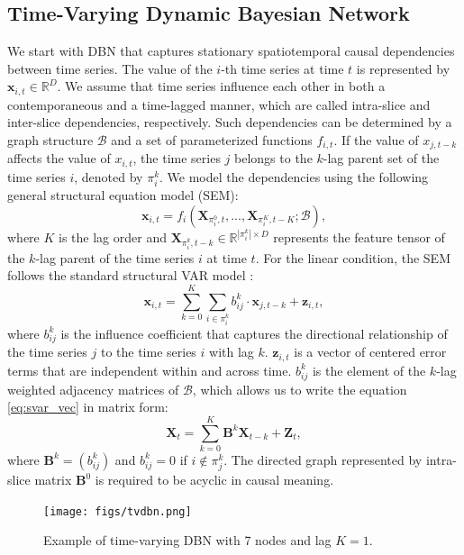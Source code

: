\documentclass[letterpaper, 10 pt, conference]{ieeeconf}
\begin{document}
\subsection{Time-Varying Dynamic Bayesian Network}
We start with DBN that captures stationary spatiotemporal causal dependencies between time series. The value of the $i$-th time series at time $t$ is represented by $\mathbf{x}_{i,t}\in \mathbb{R}^D$. We assume that time series influence each other in both a contemporaneous and a time-lagged manner, which are called intra-slice and inter-slice dependencies, respectively. Such dependencies can be determined by a graph structure $\mathcal{B}$ and a set of parameterized functions $f_{i,t}$. If the value of $x_{j,t-k}$ affects the value of $x_{i, t}$, the time series $j$ belongs to the $k$-lag parent set of the time series $i$, denoted by $\pi_i^k$. We model the dependencies using the following general structural equation model (SEM):
\begin{equation}
        \label{eq:def_sem}
        \mathbf{x}_{i,t}=f_i(\mathbf{X}_{\pi_i^0, t},...,\mathbf{X}_{\pi_i^K, t-K}; \mathcal{B}),
\end{equation}
where $K$ is the lag order and $\mathbf{X}_{\pi_i^k, t-k}\in \mathbb{R}^{|\pi_i^k|\times D}$ represents the feature tensor of the $k$-lag parent of the time series $i$ at time $t$. For the linear condition, the SEM follows the standard structural VAR model \cite{kilian2013structural}:
\begin{equation}
    \label{eq:svar_vec}\mathbf{x}_{i,t}=\sum_{k=0}^K\sum_{i\in\pi_i^k}b_{ij}^k\cdot\mathbf{x}_{j,t-k}+\mathbf{z}_{i,t},
\end{equation}
where $b_{ij}^k$ is the influence coefficient that captures the directional relationship of the time series $j$ to the time series $i$ with lag $k$. $\mathbf{z}_{i,t}$ is a vector of centered error terms that are independent within and across time. $b_{ij}^k$ is the element of the $k$-lag weighted adjacency matrices of $\mathcal{B}$, which allows us to write the equation \eqref{eq:svar_vec} in matrix form:
\begin{equation}
        \label{eq:svar_mat}
        \mathbf{X}_t=\sum_{k=0}^K\mathbf{B}^k\mathbf{X}_{t-k}+\mathbf{Z}_t,
\end{equation}
where $\mathbf{B}^k=(b_{ij}^k)$ and $b_{ij}^k=0$ if $i\not\in\pi_{j}^k$. 
The directed graph represented by intra-slice matrix $\mathbf{B}^0$ is required to be acyclic in causal meaning.

\begin{figure}[t]
        \centering
        \texttt{[image: figs/tvdbn.png]}\
        \caption{Example of time-varying DBN with 7 nodes and lag $K=1$.}
        \label{fig:tvdbn}
\end{figure}
\end{document}
